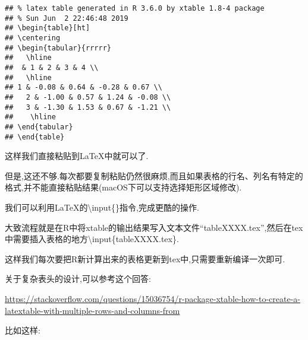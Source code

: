 \documentclass[]{ctexbook}
\begin{document}
\begin{verbatim}
## % latex table generated in R 3.6.0 by xtable 1.8-4 package
## % Sun Jun  2 22:46:48 2019
## \begin{table}[ht]
## \centering
## \begin{tabular}{rrrrr}
##   \hline
##  & 1 & 2 & 3 & 4 \\ 
##   \hline
## 1 & -0.08 & 0.64 & -0.28 & 0.67 \\ 
##   2 & -1.00 & 0.57 & 1.24 & -0.08 \\ 
##   3 & -1.30 & 1.53 & 0.67 & -1.21 \\ 
##    \hline
## \end{tabular}
## \end{table}
\end{verbatim}

这样我们直接粘贴到LaTeX中就可以了.

但是,这还不够.每次都要复制粘贴仍然很麻烦,而且如果表格的行名、列名有特定的格式,并不能直接粘贴结果(macOS下可以支持选择矩形区域修改).

我们可以利用LaTeX的\textbackslash{}input\{\}指令,完成更酷的操作.

大致流程就是在R中将xtable的输出结果写入文本文件``tableXXXX.tex'',然后在tex中需要插入表格的地方\textbackslash{}input\{tableXXXX.tex\}.

这样我们每次要把R新计算出来的表格更新到tex中,只需要重新编译一次即可.

关于复杂表头的设计,可以参考这个回答:

\url{https://stackoverflow.com/questions/15036754/r-package-xtable-how-to-create-a-latextable-with-multiple-rows-and-columns-from}

比如这样:
\end{document}
